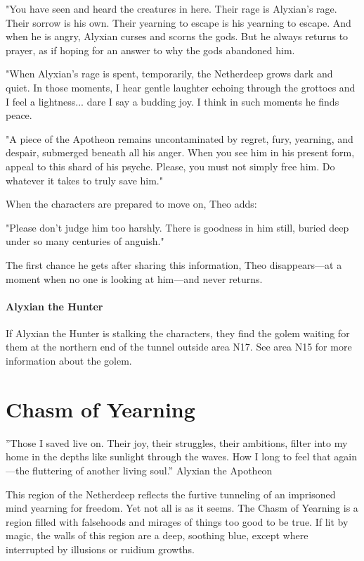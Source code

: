 \documentclass[10pt,a4paper,twoside,bg=print,twocolumn,openany,nodeprecatedcode]{dndbook}
\begin{document}
\begin{DndReadAloud}{}
"You have seen and heard the creatures in here. Their rage is Alyxian's rage. Their sorrow is his own. Their yearning to escape is his yearning to escape. And when he is angry, Alyxian curses and scorns the gods. But he always returns to prayer, as if hoping for an answer to why the gods abandoned him.

"When Alyxian's rage is spent, temporarily, the Netherdeep grows dark and quiet. In those moments, I hear gentle laughter echoing through the grottoes and I feel a lightness... dare I say a budding joy. I think in such moments he finds peace.

"A piece of the Apotheon remains uncontaminated by regret, fury, yearning, and despair, submerged beneath all his anger. When you see him in his present form, appeal to this shard of his psyche. Please, you must not simply free him. Do whatever it takes to truly save him."

\end{DndReadAloud}

When the characters are prepared to move on, Theo adds:

\begin{DndReadAloud}{}
"Please don't judge him too harshly. There is goodness in him still, buried deep under so many centuries of anguish."

\end{DndReadAloud}

The first chance he gets after sharing this information, Theo disappears—at a moment when no one is looking at him—and never returns.

\paragraph{Alyxian the Hunter}
If Alyxian the Hunter is stalking the characters, they find the golem waiting for them at the northern end of the tunnel outside area N17. See area N15 for more information about the golem.

\section{Chasm of Yearning}
\DndQuote%
{}
{''Those I saved live on. Their joy, their struggles, their ambitions, filter into my home in the depths like sunlight through the waves. How I long to feel that again—the fluttering of another living soul.''}
{Alyxian the Apotheon}

This region of the Netherdeep reflects the furtive tunneling of an imprisoned mind yearning for freedom. Yet not all is as it seems. The Chasm of Yearning is a region filled with falsehoods and mirages of things too good to be true. If lit by magic, the walls of this region are a deep, soothing blue, except where interrupted by illusions or ruidium growths.
\end{document}
